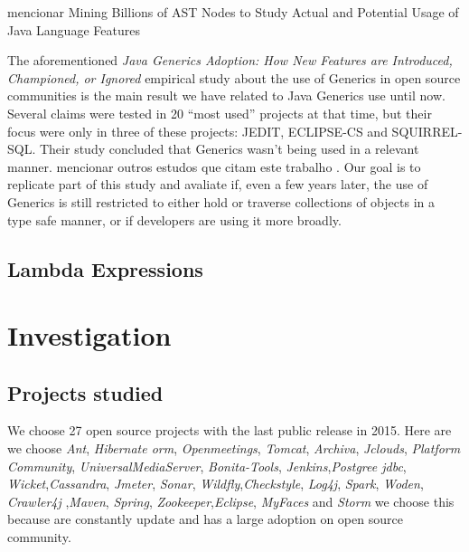 \documentclass{sig-alternate-05-2015}
\begin{document}
{\color{blue} mencionar Mining Billions of AST Nodes to Study Actual and
Potential Usage of Java Language Features }

The aforementioned \textit{ 
Java Generics Adoption: How New Features are
Introduced, Championed, or Ignored
} empirical study about the use of Generics in open source communities is the main result we have related to Java Generics use until now. Several claims were tested in 20 ``most used'' projects at that time, but their focus were only in three of these projects: JEDIT, ECLIPSE-CS and SQUIRREL-SQL.
Their study concluded that Generics wasn't being used in a relevant manner.
{\color{blue} mencionar outros estudos que citam este trabalho }.
Our goal is to replicate part of this study and avaliate if, even a few years later, the use of Generics is still restricted to either hold or traverse collections of objects in a type safe manner, or if developers are using it more broadly.

\subsection{Lambda Expressions}






\section{Investigation}

\subsection{Projects studied}

We choose 27 open source projects with the last public release in 2015. Here are we choose \textit{Ant}, \textit{Hibernate orm}, \textit{Openmeetings}, \textit{Tomcat}, \textit{Archiva}, \textit{Jclouds}, \textit{Platform Community}, \textit{UniversalMediaServer}, \textit{Bonita-Tools}, \textit{Jenkins},\textit{Postgree jdbc}, \textit{Wicket},\textit{Cassandra}, \textit{Jmeter}, \textit{Sonar}, \textit{Wildfly},\textit{Checkstyle}, \textit{Log4j}, \textit{Spark}, \textit{Woden}, \textit{Crawler4j} ,\textit{Maven}, \textit{Spring}, \textit{Zookeeper},\textit{Eclipse}, \textit{MyFaces} and \textit{Storm} we choose this because are constantly update and has a large adoption on open source community.\\ 
\end{document}
